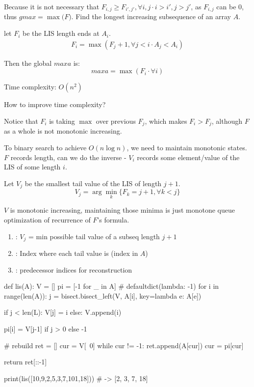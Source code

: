 Because it is not necessary that $F_{i,j}\geq F_{i',j'}, \forall i,j\cdot i>i', j>j'$, as $F_{i,j}$ can be 0, thus  $gmax=\max\big(F\big)$.
 Find the longest increasing subsequence of an array $A$.

let $F_i$ be the LIS length ends at $A_i$. 
\begin{eqnarray*}
F_i = \max(F_j+1, \forall j < i \cdot A_j<A_i)
\end{eqnarray*}

Then the global $maxa$ is:
$$
maxa = \max(F_i\cdot \forall i)
$$

Time complexity: $O(n^2)$

How to improve time complexity? 

Notice that $F_i$ is taking $\max$ over previous $F_j$, which makes $F_i > F_j$, although $F$ as a whole is not monotonic increasing. 

To binary search to achieve $O(n \log n)$, we need to maintain monotonic states. $F$ records length, can we do the inverse - $V_i$ records some element/value of the LIS of some length $i$.

Let $V_{j}$ be the smallest tail value of the LIS of length $j+1$. 
$$
V_j = \arg\min_k\{ F_k = j+1, \forall k < j\}
$$

$V$ is monotonic increasing, maintaining those minima is just monotone queue optimization of recurrence of $F$'s formula.

\begin{enumerate}
\item {}: $V_j$ = min possible tail value of a subseq length $j+1$
\item {}: Index where each tail value is (index in $A$)
\item {}: predecessor indices for reconstruction
\end{enumerate}

\begin{python}
def lis(A):
    V = []
    pi = [-1 for _ in A]  # defaultdict(lambda: -1)
    for i in range(len(A)):
        j = bisect.bisect_left(V, A[i], 
            key=lambda e: A[e])

        if j < len(L):
            V[j] = i
        else:
            V.append(i)
        
        pi[i] = V[j-1] if j > 0 else -1

    # rebuild
    ret = []
    cur = V[~0]
    while cur != -1:
        ret.append(A[cur])
        cur = pi[cur]
        
    return ret[::-1]

print(lis([10,9,2,5,3,7,101,18]))   # -> [2, 3, 7, 18]
\end{python}

